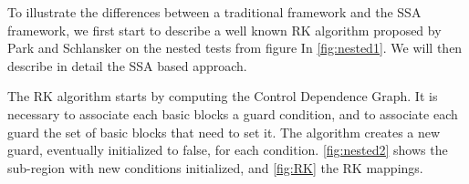 To illustrate the differences between a traditional framework and the SSA framework, we first start to describe a well known RK algorithm proposed by Park and Schlansker  on the nested tests from figure In \ref{fig:nested1}. We will then describe in detail the SSA based approach.

The RK algorithm starts by computing the Control Dependence Graph. It is necessary to associate each basic blocks a guard condition, and to associate each guard the set of basic blocks that need to set it. The algorithm creates a new guard, eventually initialized to false, for each condition. \ref{fig:nested2} shows the sub-region with new conditions initialized, and \ref{fig:RK} the RK mappings.

\begin{figure}
\centering
\end{figure}
